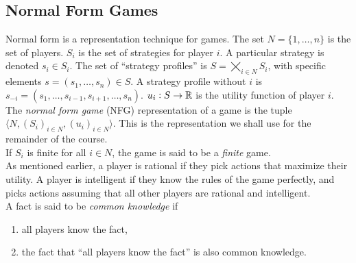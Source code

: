 \subsection{Normal Form Games}

	Normal form is a representation technique for games. The set $N = \{1,\ldots,n\}$ is the set of players. $S_i$ is the set of strategies for player $i$. A particular strategy is denoted $s_i \in S_i$. The set of ``strategy profiles'' is $S = \bigtimes_{i \in N} S_i$, with specific elements $s = (s_1,\ldots,s_n) \in S$. A strategy profile without $i$ is $s_{-i} = (s_1,\ldots,s_{i-1},s_{i+1},\ldots,s_n)$. $u_i : S \to \mathbb{R}$ is the utility function of player $i$.\\
	The \emph{normal form game} (NFG) representation of a game is the tuple $\langle N , (S_i)_{i \in N} , (u_i)_{i \in N} \rangle$. This is the representation we shall use for the remainder of the course. \\
	If $S_i$ is finite for all $i \in N$, the game is said to be a \emph{finite} game.\\

	As mentioned earlier, a player is rational if they pick actions that maximize their utility. A player is intelligent if they know the rules of the game perfectly, and picks actions assuming that all other players are rational and intelligent.\\

	A fact is said to be \emph{common knowledge} if
	\begin{enumerate}
		\item all players know the fact,
		\item the fact that ``all players know the fact'' is also common knowledge.
	\end{enumerate}

